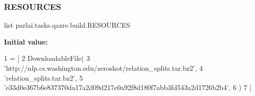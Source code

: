 \subsubsection{\texorpdfstring{R\+E\+S\+O\+U\+R\+C\+ES}{RESOURCES}}
{\footnotesize\ttfamily list parlai.\+tasks.\+qazre.\+build.\+R\+E\+S\+O\+U\+R\+C\+ES}

{\bfseries Initial value\+:}
\begin{DoxyCode}
1 =  [
2     DownloadableFile(
3         \textcolor{stringliteral}{'http://nlp.cs.washington.edu/zeroshot/relation\_splits.tar.bz2'},
4         \textcolor{stringliteral}{'relation\_splits.tar.bz2'},
5         \textcolor{stringliteral}{'e33d0e367b6e837370da17a2d09d217e0a92f8d180f7abb3fd543a2d1726b2b4'},
6     )
7 ]
\end{DoxyCode}
